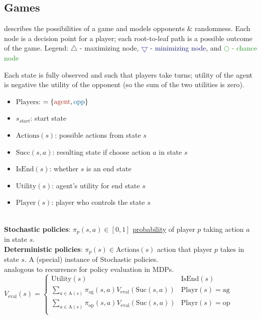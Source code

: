 \newcommand{\agentcolor}[1]{\textcolor{Mahogany}{#1}}
\newcommand{\oppcolor}[1]{\textcolor{MidnightBlue}{#1}}
\newcommand{\chancecolor}[1]{\textcolor{ForestGreen}{#1}}
\newcommand{\dcolor}[1]{\textcolor{Fuchsia}{#1}}

\subsection{Games}

 describes the possibilities of a game and models opponents \&
randomness. Each node is a decision point for a player; each root-to-leaf path
is a possible outcome of the game.  Legend: \agentcolor{$\bigtriangleup$ -
maximizing node}, \oppcolor{$\bigtriangledown$ - minimizing node}, and
\chancecolor{$\bigcirc$ - chance node}

 Each state is fully observed and such that
players take turns; utility of the agent is negative the utility of the opponent
(so the sum of the two utilities is zero).
\begin{itemize}
    \item $\text{Players}$: $ = \{\agentcolor{\text{agent}}, \oppcolor{\text{opp}}\}$
    \item $s_{start}$: start state
    \item $\text{Actions}(s)$: possible actions from state $s$
    \item $\text{Succ}(s, a)$: resulting state if choose action $a$ in state $s$
    \item $\text{IsEnd}(s)$: whether $s$ is an end state
    \item $\text{Utility}(s)$: agent's utility for end state $s$
    \item $\text{Player}(s)$: player who controls the state $s$
\end{itemize}

\\
\textbf{Stochastic policies}: $\pi_{p}(s, a) \in \left[0, 1\right]$
\underline{probability} of player $p$ taking action $a$ in state $s$.\\
\textbf{Deterministic policies}: $\pi_{p}(s) \in \text{Actions}(s)$ action that
player $p$ takes in state $s$. A (special) instance of Stochastic policies.\\

 analogous to recurrence for policy evaluation in MDPs.
$V_{\text{eval}}(s) = \begin{cases}
    \text{Utility}(s) & \text{IsEnd}(s) \\
    \sum_{a \in \text{A}(s)} \pi_{\text{ag}}(s, a) V_{\text{eval}}(\text{Suc}(s, a)) & \text{Playr}(s) = \text{ag} \\
    \sum_{a \in \text{A}(s)} \pi_{\text{op}}(s, a) V_{\text{eval}}(\text{Suc}(s, a)) & \text{Playr}(s) = \text{op} \\
\end{cases}$

